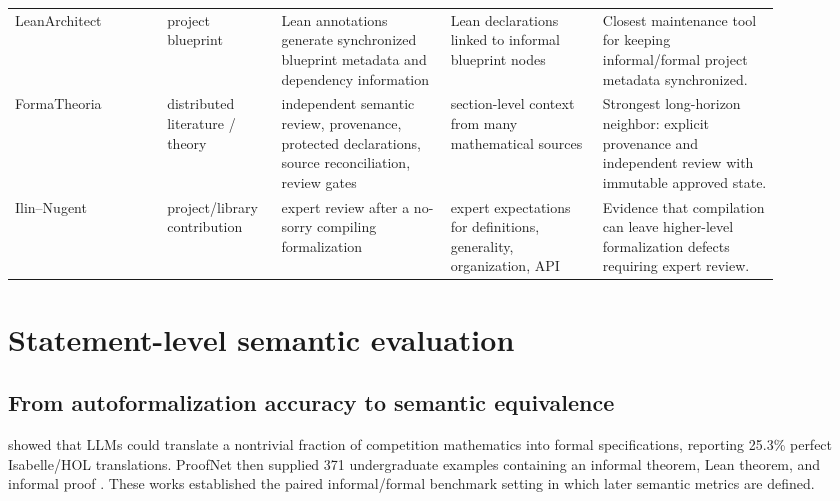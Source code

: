 \documentclass[11pt]{article}
\begin{document}
\begin{landscape}
\begin{longtable}{@{}p{0.18\linewidth}p{0.12\linewidth}p{0.20\linewidth}p{0.18\linewidth}p{0.21\linewidth}@{}}
LeanArchitect \citep{zhu2026leanarchitect} & project blueprint & Lean annotations generate synchronized blueprint metadata and dependency information & Lean declarations linked to informal blueprint nodes & Closest maintenance tool for keeping informal/formal project metadata synchronized. \\

FormaTheoria \citep{nie2026formatheoria} & distributed literature / theory & independent semantic review, provenance, protected declarations, source reconciliation, review gates & section-level context from many mathematical sources & Strongest long-horizon neighbor: explicit provenance and independent review with immutable approved state. \\

Ilin--Nugent \citep{ilin2026sorries} & project/library contribution & expert review after a no-sorry compiling formalization & expert expectations for definitions, generality, organization, API & Evidence that compilation can leave higher-level formalization defects requiring expert review. \\

\end{longtable}
\end{landscape}

\section{Statement-level semantic evaluation}

\subsection{From autoformalization accuracy to semantic equivalence}

\citet{wu2022autoformalization} showed that LLMs could translate a nontrivial
fraction of competition mathematics into formal specifications, reporting
25.3\% perfect Isabelle/HOL translations.  ProofNet then supplied 371
undergraduate examples containing an informal theorem, Lean theorem, and
informal proof \citep{azerbayev2023proofnet}.  These works established the
paired informal/formal benchmark setting in which later semantic metrics are
defined.
\end{document}
